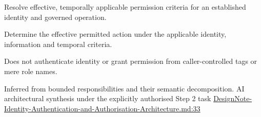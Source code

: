 
Resolve effective, temporally applicable permission criteria for an established identity and governed operation.



Determine the effective permitted action under the applicable identity, information and temporal criteria.



Does not authenticate identity or grant permission from caller-controlled tags or mere role names.


Inferred from bounded responsibilities and their semantic decomposition. AI architectural synthesis under the explicitly authorised Step 2 task \hyperref[evidence:13afd583ac468df7]{DesignNote-Identity-Authentication-and-Authorisation-Architecture.md:33}
